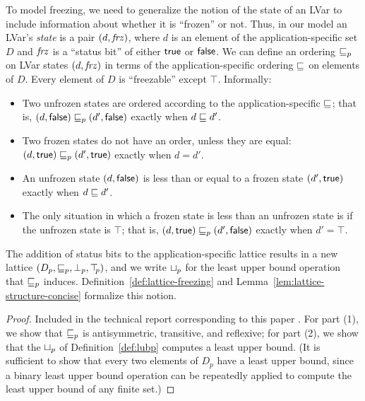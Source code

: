 To model freezing, we need to
generalize the notion of the state of an LVar to include
information about whether it is ``frozen'' or not.  Thus, in our model
 an LVar's \emph{state} is a pair $(d, \mathit{frz})$, where $d$
is an element of the application-specific set $D$ and $\mathit{frz}$ is a ``status
bit'' of either $\textsf{true}$ or $\textsf{false}$.  We can define an
ordering $\sqsubseteq_p$ on LVar states $(d, \mathit{frz})$ in terms of the
application-specific ordering $\sqsubseteq$ on elements of $D$.  Every element of $D$ is ``freezable'' except $\top$.  Informally:
\begin{itemize}
\item Two unfrozen states are ordered according to the
  application-specific $\sqsubseteq$; that is, $(d, \textsf{false}) \sqsubseteq_p (d', \textsf{false})$ 
  exactly when $d \sqsubseteq d'$.
\item Two frozen states do not have an order, unless they are equal:
  $(d, \textsf{true}) \sqsubseteq_p (d', \textsf{true})$ exactly when $d = d'$.
\item An unfrozen state $(d, \textsf{false})$ is less than or equal to a
  frozen state $(d', \textsf{true})$ exactly when $d \sqsubseteq d'$.
\item The only situation in which a frozen state is less than an
  unfrozen state is if the unfrozen state is $\top$; that is, $(d, \textsf{true})
  \sqsubseteq_p (d', \textsf{false})$ exactly when $d' = \top$.
\end{itemize}
The addition of status bits to the application-specific lattice results in a
new lattice $(D_p, \sqsubseteq_p, \bot_{p}, \top\hspace{-0.85mm}_{p})$,
and we  write $ \sqcup_p $ for the least upper bound operation that $\sqsubseteq_p$ induces.
Definition~\ref{def:lattice-freezing} and
Lemma~\ref{lem:lattice-structure-concise}
formalize this notion.


{\DefLatticeFreezing}


\LemLatticeStructureConcise

\begin{proof}
Included in the technical report corresponding to this paper \cite{lvish-tech-report}.
For part (1), we show that $\sqsubseteq_p$ is
antisymmetric, transitive, and reflexive; for part (2), we show that
the $ \sqcup_p $ of Definition~\ref{def:lubp} computes a least upper
bound. (It is sufficient to show that every two elements of $D_p$ have
a least upper bound, since a binary least upper bound operation can be
repeatedly applied to compute the least upper bound of any finite
set.)
\end{proof}
\fi

